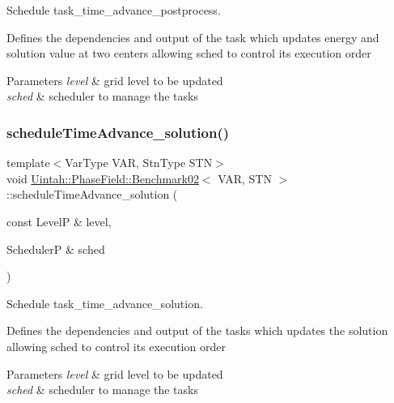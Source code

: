 Schedule task\+\_\+time\+\_\+advance\+\_\+postprocess. 

Defines the dependencies and output of the task which updates energy and solution value at two centers allowing sched to control its execution order


\begin{DoxyParams}{Parameters}
{\em level} & grid level to be updated \\
\hline
{\em sched} & scheduler to manage the tasks \\
\hline
\end{DoxyParams}
\mbox{\label{classUintah_1_1PhaseField_1_1Benchmark02_a183dca13aaa1f5fbfec6c2d7c74a8ffc}} 
\subsubsection{\texorpdfstring{schedule\+Time\+Advance\+\_\+solution()}{scheduleTimeAdvance\_solution()}}
{\footnotesize\ttfamily template$<$Var\+Type V\+AR, Stn\+Type S\+TN$>$ \\
void \hyperlink{classUintah_1_1PhaseField_1_1Benchmark02}{Uintah\+::\+Phase\+Field\+::\+Benchmark02}$<$ V\+AR, S\+TN $>$\+::schedule\+Time\+Advance\+\_\+solution (\begin{DoxyParamCaption}\item[{const LevelP \&}]{level,  }\item[{SchedulerP \&}]{sched }\end{DoxyParamCaption})\hspace{0.3cm}{\ttfamily [protected]}}



Schedule task\+\_\+time\+\_\+advance\+\_\+solution. 

Defines the dependencies and output of the tasks which updates the solution allowing sched to control its execution order


\begin{DoxyParams}{Parameters}
{\em level} & grid level to be updated \\
\hline
{\em sched} & scheduler to manage the tasks \\
\hline
\end{DoxyParams}
\mbox{\label{classUintah_1_1PhaseField_1_1Benchmark02_a105d595f52243f6c86d55f69f6bc6719}} 
